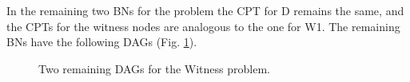 \documentclass[
  10pt,
]{scrartcl}
\begin{document}
In the remaining two BNs for the problem the CPT for \textsf{D} remains the same, and the CPTs for the witness nodes are analogous to the one for \textsf{W1}. The remaining BNs have the following DAGs (Fig. \ref{fig:witness}).

\begin{figure}[H]
\centering
{}

\caption{Two remaining DAGs for the \textsf{Witness} problem.}
\label{fig:witness}
\end{figure}
\end{document}
